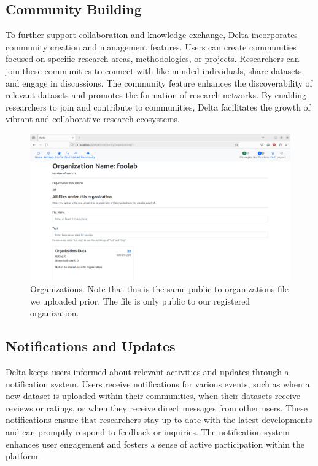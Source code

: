 \documentclass[conference]{IEEEtran}
\begin{document}
\subsection{Community Building}
To further support collaboration and knowledge exchange, Delta incorporates community creation and management features. Users can create communities focused on specific research areas, methodologies, or projects. Researchers can join these communities to connect with like-minded individuals, share datasets, and engage in discussions. The community feature enhances the discoverability of relevant datasets and promotes the formation of research networks. By enabling researchers to join and contribute to communities, Delta facilitates the growth of vibrant and collaborative research ecosystems.
\begin{figure}[h]
  \centering
  \includegraphics[width=\columnwidth]{figures/organization.png}
  \caption{Organizations. Note that this is the same public-to-organizations file we uploaded prior. The file is only public to our registered organization.}
  \label{fig:delta-organization}
\end{figure}

\subsection{Notifications and Updates}
Delta keeps users informed about relevant activities and updates through a notification system. Users receive notifications for various events, such as when a new dataset is uploaded within their communities, when their datasets receive reviews or ratings, or when they receive direct messages from other users. These notifications ensure that researchers stay up to date with the latest developments and can promptly respond to feedback or inquiries. The notification system enhances user engagement and fosters a sense of active participation within the platform.
\end{document}

